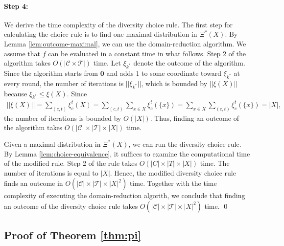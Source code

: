 \documentclass[12pt]{amsart}
\theoremstyle{remark}
\begin{document}
\paragraph{Step 4: }
We derive the time complexity of the diversity choice rule. The first step for calculating the choice rule is to find one maximal distribution in $\Xi^*(X)$. By Lemma \ref{lem:outcome-maximal}, we can use the domain-reduction algorithm. We assume that $f$ can be evaluated in a constant time in what follows.
Step 2 of the algorithm takes $O(|\mathcal{C}\times \mathcal{T}|)$ time.
Let $\xi_{k^*}$ denote the outcome of the algorithm. Since the algorithm starts from $\mathbf{0}$ and adds $1$ to some coordinate toward $\xi_{k^*}$ at every round, the number of iterations is $||\xi_{k^*}||$, which is bounded by $||\xi(X)||$ because $\xi_{k^*}\leq \xi(X)$. Since
\begin{align*}
||\xi(X)||=\sum_{(c,t)}\xi_c^t(X)=\sum_{(c,t)}\sum_{x\in X}\xi_c^t(\{x\})=\sum_{x\in X}\sum_{(c,t)}\xi_c^t(\{x\})=|X|,
\end{align*}
the number of iterations is bounded by $O(|X|)$. Thus, finding an outcome of the algorithm takes $O(|\mathcal{C}|\times |\mathcal{T}|\times |X|)$ time.

Given a maximal distribution in $\Xi^*(X)$, we can run the diversity choice rule. By Lemma \ref{lem:choice-equivalence}, it suffices to examine the computational time of the modified rule. Step 2 of the rule takes $O(|C|\times |T|\times |X|)$ time.
The number of iterations is equal to $|X|$. Hence, the modified diversity choice rule finds an outcome in $O(|\mathcal{C}|\times |\mathcal{T}|\times |X|^2)$ time.
Together with the time complexity of executing the domain-reduction algorith, we conclude that finding an outcome of the diversity choice rule takes $O(|\mathcal{C}|\times |\mathcal{T}|\times |X|^2)$ time.
\qed

\bigskip




\subsection*{Proof of Theorem \ref{thm:pi}}
\end{document}
